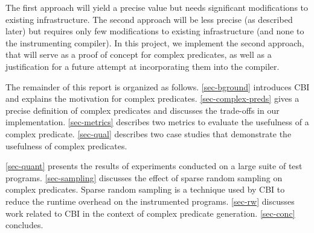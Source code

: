 The first approach will yield a precise value but needs significant modifications to existing infrastructure.  The second approach will be less precise (as described later) but requires only few modifications to existing infrastructure (and none to the instrumenting compiler).  In this project, we implement the second approach, that will serve as a proof of concept for complex predicates, as well as a justification for a future attempt at incorporating them into the compiler.

The remainder of this report is organized as follows.  \autoref{sec-bground} introduces CBI and explains the motivation for complex predicates.  \autoref{sec-complex-preds} gives a precise definition of complex predicates and discusses the trade-offs in our implementation.  \autoref{sec-metrics} describes two metrics to evaluate the usefulness of a complex predicate.  \autoref{sec-qual} describes two case studies that demonstrate the usefulness of complex predicates.  

\autoref{sec-quant} presents the results of experiments conducted on a large suite of test programs.  \autoref{sec-sampling} discusses the effect of sparse random sampling on complex predicates.  Sparse random sampling is a technique used by CBI to reduce the runtime overhead on the instrumented programs.  \autoref{sec-rw} discusses work related to CBI in the context of complex predicate generation.  \autoref{sec-conc} concludes.

